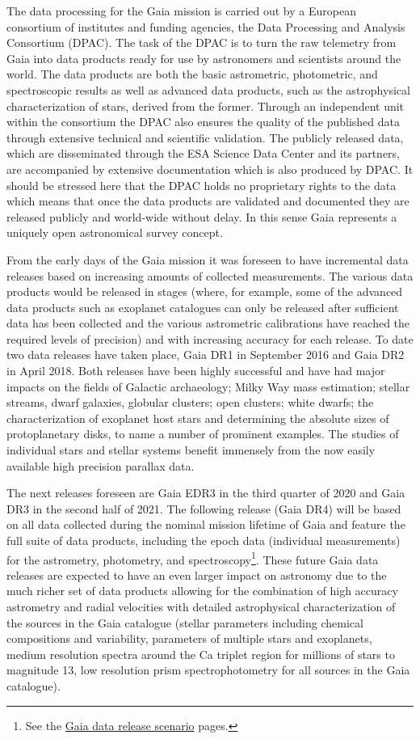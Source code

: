 The data processing for the Gaia mission is carried out by a European consortium of institutes and funding agencies, the Data Processing and Analysis Consortium (DPAC). The task of the DPAC is to turn the raw telemetry from Gaia into data products ready for use by astronomers and scientists around the world. The data products are both the basic astrometric, photometric, and spectroscopic results as well as advanced data products, such as the astrophysical characterization of stars, derived from the former. Through an independent unit within the consortium the DPAC also ensures the quality of the published data through extensive technical and scientific validation. The publicly released data, which are disseminated through the ESA Science Data Center and its partners, are accompanied by extensive documentation which is also produced by DPAC. It should be stressed here that the DPAC holds no proprietary rights to the data which means that once the data products are validated and documented they are released publicly and world-wide without delay. In this sense Gaia represents a uniquely open astronomical survey concept.

From the early days of the Gaia mission it was foreseen to have incremental data releases based on increasing amounts of collected measurements. The various data products would be released in stages (where, for example, some of the advanced data products such as exoplanet catalogues can only be released after sufficient data has been collected and the various astrometric calibrations have reached the required levels of precision) and with increasing accuracy for each release. To date two data releases have taken place, Gaia DR1 in September 2016 and Gaia DR2 in April 2018. Both releases have been highly successful and have had major impacts on the fields of Galactic archaeology; Milky Way mass estimation; stellar streams, dwarf galaxies, globular clusters; open clusters; white dwarfs; the characterization of exoplanet host stars and determining the absolute sizes of protoplanetary disks, to name a number of prominent examples. The studies of individual stars and stellar systems benefit immensely from the now easily available high precision parallax data.

The next releases foreseen are Gaia EDR3 in the third quarter of 2020 and Gaia DR3 in the second half of 2021. The following release (Gaia DR4) will be based on all data collected during the nominal mission lifetime of Gaia and feature the full suite of data products, including the epoch data (individual measurements) for the astrometry, photometry, and spectroscopy\footnote{See the \href{https://www.cosmos.esa.int/web/gaia/release}{Gaia data release scenario} pages.}. These future Gaia data releases are expected to have an even larger impact on astronomy due to the much richer set of data products allowing for the combination of high accuracy astrometry and radial velocities with detailed astrophysical characterization of the sources in the Gaia catalogue (stellar parameters including chemical compositions and variability, parameters of multiple stars and exoplanets, medium resolution spectra around the Ca triplet region for millions of stars to magnitude 13, low resolution prism spectrophotometry for all sources in the Gaia catalogue). 

